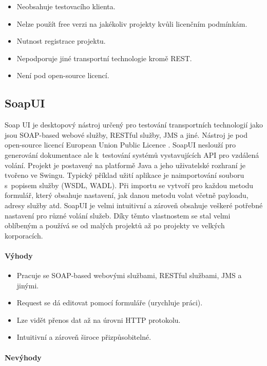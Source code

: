 \documentclass[11pt,twoside,a4paper]{book}
\begin{document}
\begin{itemize}
  \item Neobsahuje testovacího klienta.
  \item Nelze použít free verzi na jakékoliv projekty kvůli licenčním podmínkám.
  \item Nutnost registrace projektu.
  \item Nepodporuje jiné transportní technologie kromě REST.
  \item Není pod open-source licencí.
\end{itemize}

\subsection{SoapUI}

Soap UI \cite{SoapUIHome} je desktopový nástroj určený pro testování
transportních technologií jako jsou SOAP-based webové služby, RESTful služby,
JMS a jiné. Nástroj je pod open-source licencí European Union Public
Licence \cite{EUPL07}. SoapUI neslouží pro generování dokumentace ale k~testování
systémů vystavujících API pro vzdálená volání. Projekt je postavený na platformě
Java a jeho uživatelské rozhraní je tvořeno ve Swingu. Typický příklad užití
aplikace je naimportování souboru s~popisem služby (WSDL, WADL). Při importu se
vytvoří pro každou metodu formulář, který obsahuje nastavení, jak danou metodu
volat včetně payloadu, adresy služby atd. SoapUI je velmi intuitivní a zároveň
obsahuje veškeré potřebné nastavení pro různé volání služeb. Díky těmto
vlastnostem se stal velmi oblíbeným a používá se od malých projektů až po
projekty ve velkých korporacích.

\paragraph{Výhody}

\begin{itemize}
  \item Pracuje se SOAP-based webovými službami, RESTful službami, JMS a jinými.
  \item Request se dá editovat pomocí formuláře (urychluje práci).
  \item Lze vidět přenos dat až na úrovni HTTP protokolu.
  \item Intuitivní a zároveň široce přizpůsobitelné.
\end{itemize}

\paragraph{Nevýhody}
\end{document}
